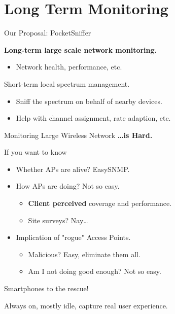 \section{Long Term Monitoring}

\begin{frame}{Our Proposal: PocketSniffer}
  \begin{figure}
    \centering
  \end{figure}
  \textbf{Long-term large scale network monitoring.}
  \begin{itemize}
    \item Network health, performance, etc.
  \end{itemize}
  \color{gray}
  Short-term local spectrum management.
  \begin{itemize}
    \item \color{gray} Sniff the spectrum on behalf of nearby devices.
    \item Help with channel assignment, rate adaption, etc.
  \end{itemize}
\end{frame}


\begin{frame}{\Large Monitoring {\Huge Large} Wireless Network}
  \huge\textbf{\ldots is Hard.}\normalsize
  \begin{block}{If you want to know}
    \begin{itemize}
      \item Whether APs are alive? Easy\textendash SNMP\footnotemark.
      \item How APs are doing? Not so easy.
        \begin{itemize}
          \item \textbf{Client perceived} coverage and performance.
          \item Site surveys? Nay\ldots
        \end{itemize}
      \item Implication of "rogue" Access Points.
        \begin{itemize}
          \item Malicious? Easy, eliminate them all.
          \item Am I not doing good enough? Not so easy.
        \end{itemize}
    \end{itemize}
  \end{block}
  \huge Smartphones to the rescue!

  \large
  Always on, mostly idle, capture real user experience.
\end{frame}

